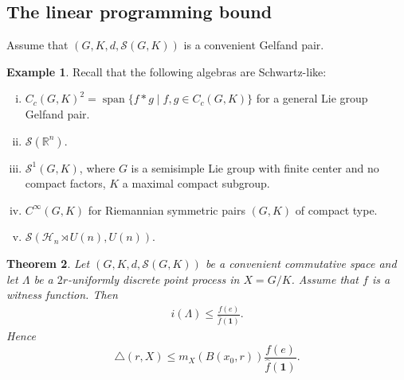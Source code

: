 \documentclass[12pt,reqno,a4paper]{amsart}
\theoremstyle{theorem}
\newtheorem{theorem}{Theorem}[section]
\theoremstyle{definition}
\newtheorem{definition}[theorem]{Definition}
\newtheorem{example}[theorem]{Example}
\numberwithin{theorem}{section}
\numberwithin{equation}{section}
\newcommand{\R}{\mathbb{R}}
\newcommand{\C}{\mathbb{C}}
\DeclareMathOperator{\lspan}{span}
\begin{document}
\subsection{The linear programming bound}
Assume that $(G,K, d, \mathcal{S}(G, K))$ is a convenient Gelfand pair.
\begin{example}
	Recall that the following algebras are Schwartz-like:
	\begin{enumerate}[(i)]
		\item $C_c(G,K)^2=\lspan\{f*g\mid f,g\in C_c(G,K)\}$ for a general Lie group Gelfand pair.
		\item $\mathscr{S}(\R^n)$.
		\item $\mathscr{S}^1(G,K)$, where $G$ is a semisimple Lie group with finite center and no compact factors, $K$ a maximal compact subgroup.
		\item $C^\infty(G,K)$ for Riemannian symmetric pairs $(G,K)$ of compact type.
		\item $\mathscr{S}(\mathcal{H}_n\rtimes U(n), U(n))$.
	\end{enumerate}
\end{example}
\begin{theorem}\label{t:lp_bound}
	Let $(G, K, d, \mathcal{S}(G, K))$ be a convenient commutative space and let $\Lambda$ be a $2r$-uniformly discrete point process in $X = G/K$. Assume that $f$ is a witness function.
	Then
	\begin{align*}
		\label{e:general_estimate}i(\Lambda)\leq \frac{f(e)}{\widehat{f}(\mathbf{1})}.
	\end{align*}
	Hence 
	\[\triangle(r,X)\leq m_X(B(x_0,r))\frac{f(e)}{\widehat{f}(\mathbf{1})}.\]
\end{theorem}
\end{document}

